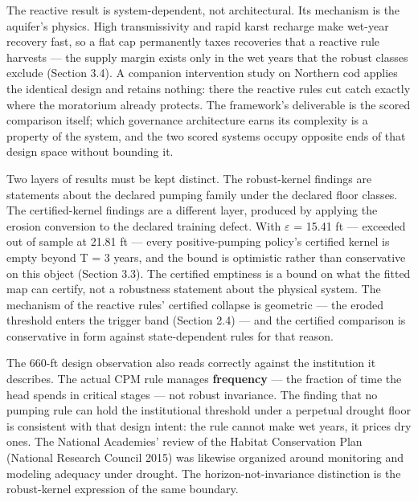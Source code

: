 The reactive result is system-dependent, not architectural. Its
mechanism is the aquifer's physics. High transmissivity and rapid karst
recharge make wet-year recovery fast, so a flat cap permanently taxes
recoveries that a reactive rule harvests --- the supply margin exists
only in the wet years that the robust classes exclude (Section 3.4). A
companion intervention study on Northern cod applies the identical
design and retains nothing: there the reactive rules cut catch exactly
where the moratorium already protects. The framework's deliverable is
the scored comparison itself; which governance architecture earns its
complexity is a property of the system, and the two scored systems
occupy opposite ends of that design space without bounding it.

Two layers of results must be kept distinct. The robust-kernel findings
are statements about the declared pumping family under the declared
floor classes. The certified-kernel findings are a different layer,
produced by applying the erosion conversion to the declared training
defect. With \ensuremath{\varepsilon} = 15.41 ft --- exceeded out of sample at 21.81 ft ---
every positive-pumping policy's certified kernel is empty beyond T = 3
years, and the bound is optimistic rather than conservative on this
object (Section 3.3). The certified emptiness is a bound on what the
fitted map can certify, not a robustness statement about the physical
system. The mechanism of the reactive rules' certified collapse is
geometric --- the eroded threshold enters the trigger band (Section 2.4)
--- and the certified comparison is conservative in form against
state-dependent rules for that reason.

The 660-ft design observation also reads correctly against the
institution it describes. The actual CPM rule manages \textbf{frequency}
--- the fraction of time the head spends in critical stages --- not
robust invariance. The finding that no pumping rule can hold the
institutional threshold under a perpetual drought floor is consistent
with that design intent: the rule cannot make wet years, it prices dry
ones. The National Academies' review of the Habitat Conservation Plan
(National Research Council 2015) was likewise organized around
monitoring and modeling adequacy under drought. The
horizon-not-invariance distinction is the robust-kernel expression of
the same boundary.

